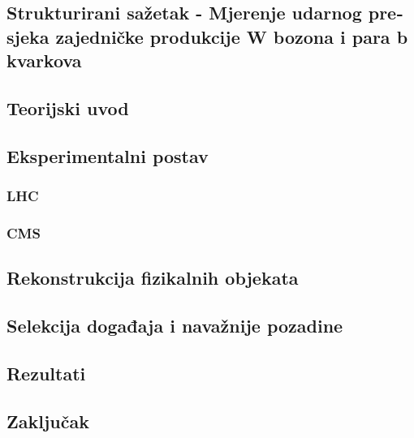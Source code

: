 \begin{otherlanguage}{croatian}
\chapter{Strukturirani sažetak - Mjerenje udarnog presjeka zajedničke produkcije W bozona i para b kvarkova} %

\label{Chapter9} %



\section{Teorijski uvod}

\section{Eksperimentalni postav}

\subsection{LHC}
\subsection{CMS}
\section{Rekonstrukcija fizikalnih objekata}

\section{Selekcija događaja i navažnije pozadine}

\section{Rezultati}

\section{Zaključak}

\end{otherlanguage}
